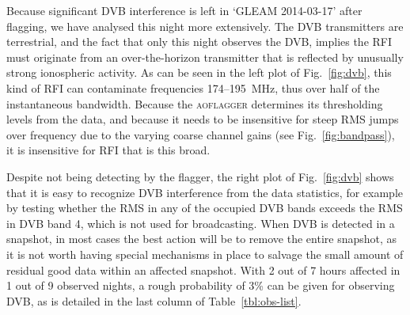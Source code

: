 \documentclass{pasa}
\begin{document}
Because significant DVB interference is left in `GLEAM 2014-03-17' after flagging, we have analysed this night more extensively. The DVB transmitters are terrestrial, and the fact that only this night observes the DVB, implies the RFI must originate from an over-the-horizon transmitter that is reflected by unusually strong ionospheric activity. As can be seen in the left plot of Fig.~\ref{fig:dvb}, this kind of RFI can contaminate frequencies 174--195~MHz, thus over half of the instantaneous bandwidth. Because the \textsc{aoflagger} determines its thresholding levels from the data, and because it needs to be insensitive for steep RMS jumps over frequency due to the varying coarse channel gains (see Fig.~\ref{fig:bandpass}), it is insensitive for RFI that is this broad.

Despite not being detecting by the flagger, the right plot of Fig.~\ref{fig:dvb} shows that it is easy to recognize DVB interference from the data statistics, for example by testing whether the RMS in any of the occupied DVB bands exceeds the RMS in DVB band 4, which is not used for broadcasting. When DVB is detected in a snapshot, in most cases the best action will be to remove the entire snapshot, as it is not worth having special mechanisms in place to salvage the small amount of residual good data within an affected snapshot. With 2 out of 7 hours affected in 1 out of 9 observed nights, a rough probability of 3\% can be given for observing DVB, as is detailed in the last column of Table~\ref{tbl:obs-list}. 
\end{document}
